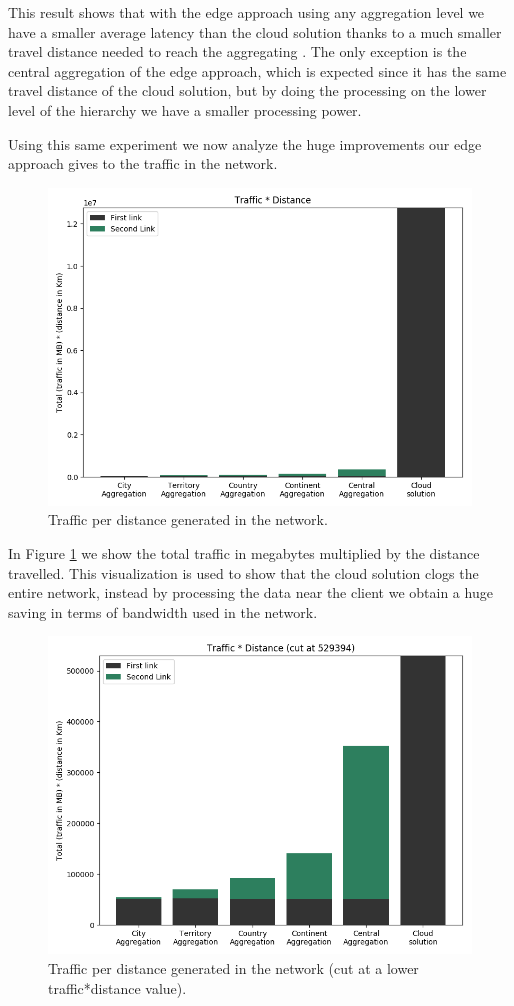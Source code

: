 This result shows that with the edge approach using any aggregation level we have a smaller average latency than the cloud solution thanks to a much smaller travel distance needed to reach the aggregating . The only exception is the central aggregation of the edge approach, which is expected since it has the same travel distance of the cloud solution, but by doing the processing on the lower level of the hierarchy we have a smaller processing power.

Using this same experiment we now analyze the huge improvements our edge approach gives to the traffic in the network.

\begin{figure}[H]
    \centering
    \includegraphics[width=0.86\linewidth]{Figures/Evaluation/write-by-traffic1.png}
    \caption{Traffic per distance generated in the network.}
    \label{fig:write-by-traffic1}
\end{figure}

In Figure \ref{fig:write-by-traffic1} we show the total traffic in megabytes multiplied by the distance travelled. This visualization is used to show that the cloud solution clogs the entire network, instead by processing the data near the client we obtain a huge saving in terms of bandwidth used in the network.

\begin{figure}[H]
    \centering
    \includegraphics[width=0.86\linewidth]{Figures/Evaluation/write-by-traffic2.png}
    \caption{Traffic per distance generated in the network (cut at a lower traffic*distance value).}
    \label{fig:write-by-traffic2}
\end{figure}

